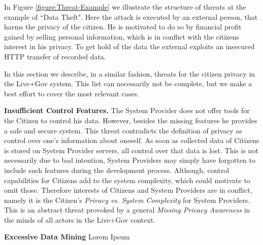 In Figure \ref{figure:Threat-Example} we illustrate the structure of threats at the example of ``Data Theft".
Here the attack is executed by an external person, that harms the privacy of the citizen.
He is motivated to do so by financial profit gained by selling personal information, which is in conflict with the citizens interest in his privacy.
To get hold of the data the external exploits an insecured HTTP transfer of recorded data.

In this section we describe, in a similar fashion, threats for the citizen privacy in the Live+Gov system.
This list can necessarily not be complete, but we make a best effort to cover the most relevant cases.



%
%
\textbf{Insufficient Control Features.}
The System Provider does not offer tools for the Citizen to control his data.
However, besides the missing features he provides a safe and secure system.
This threat contradicts the definition of privacy as control over one's information about oneself.
As soon as collected data of Citizens is stored on System Provider servers, all control over that data is lost.
This is not necessarily due to bad intention, System Providers may simply have forgotten to include such features during the development process.
Although, control capabilities for Citizens add to the system complexity, which could motivate to omit those. 
Therefore interests of Citizens and System Providers are in conflict, namely it is the Citizen's \textit{Privacy vs. System Complexity} for System Providers.
This is an abstract threat provoked by a general \textit{Missing Privacy Awareness} in the minds of all actors in the Live+Gov context.


%
%
%
\textbf{Excessive Data Mining}
Lorem Ipsum



